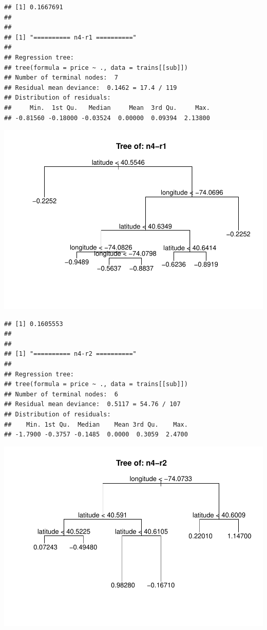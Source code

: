 \documentclass[
]{article}
\begin{document}
\begin{verbatim}
## [1] 0.1667691
## 
## 
## [1] "========== n4-r1 =========="
## 
## Regression tree:
## tree(formula = price ~ ., data = trains[[sub]])
## Number of terminal nodes:  7 
## Residual mean deviance:  0.1462 = 17.4 / 119 
## Distribution of residuals:
##     Min.  1st Qu.   Median     Mean  3rd Qu.     Max. 
## -0.81560 -0.18000 -0.03524  0.00000  0.09394  2.13800
\end{verbatim}

\includegraphics{project-code_files/figure-latex/unnamed-chunk-14-15.pdf}

\begin{verbatim}
## [1] 0.1605553
## 
## 
## [1] "========== n4-r2 =========="
## 
## Regression tree:
## tree(formula = price ~ ., data = trains[[sub]])
## Number of terminal nodes:  6 
## Residual mean deviance:  0.5117 = 54.76 / 107 
## Distribution of residuals:
##    Min. 1st Qu.  Median    Mean 3rd Qu.    Max. 
## -1.7900 -0.3757 -0.1485  0.0000  0.3059  2.4700
\end{verbatim}

\includegraphics{project-code_files/figure-latex/unnamed-chunk-14-16.pdf}
\end{document}
